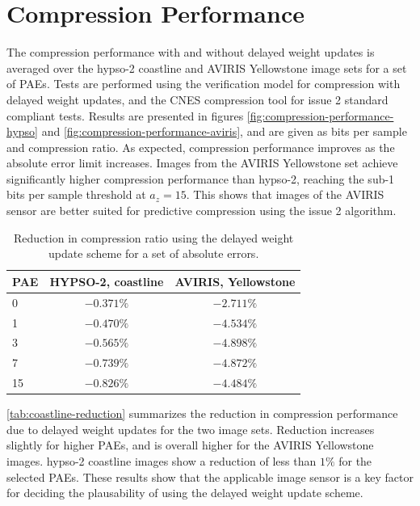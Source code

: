 \section{Compression Performance}

The compression performance with and without delayed weight updates is averaged over the \acrshort{hypso}-2 coastline and AVIRIS Yellowstone image sets for a set of \acrshort{PAE}s. Tests are performed using the verification model for compression with delayed weight updates, and the \acrshort{CNES} compression tool for issue 2 standard compliant tests. Results are presented in figures \ref{fig:compression-performance-hypso} and \ref{fig:compression-performance-aviris}, and are given as bits per sample and compression ratio. As expected, compression performance improves as the absolute error limit increases. Images from the AVIRIS Yellowstone set achieve significantly higher compression performance than \acrshort{hypso}-2, reaching the sub-1 bits per sample threshold at $a_z=15$. This shows that images of the AVIRIS sensor are better suited for predictive compression using the issue 2 algorithm.

\begin{table}[ht]
	\caption{Reduction in compression ratio using the delayed weight update scheme for a set of absolute errors.}
	\label{tab:coastline-reduction}
	\begin{center}
		\begin{tabular}{lcc}
			\hline
			\textbf{PAE} & \textbf{HYPSO-2, coastline} & \textbf{AVIRIS, Yellowstone} \\
			\hline
			0            & $-0.371\%$                  & $-2.711\%$                   \\
			1            & $-0.470\%$                  & $-4.534\%$                   \\
			3            & $-0.565\%$                  & $-4.898\%$                   \\
			7            & $-0.739\%$                  & $-4.872\%$                   \\
			15           & $-0.826\%$                  & $-4.484\%$                   \\
			\hline
		\end{tabular}
	\end{center}
\end{table}

\autoref{tab:coastline-reduction} summarizes the reduction in compression performance due to delayed weight updates for the two image sets. Reduction increases slightly for higher \acrshort{PAE}s, and is overall higher for the AVIRIS Yellowstone images. \acrshort{hypso}-2 coastline images show a reduction of less than $1\%$ for the selected \acrshort{PAE}s. These results show that the applicable image sensor is a key factor for deciding the plausability of using the delayed weight update scheme.

